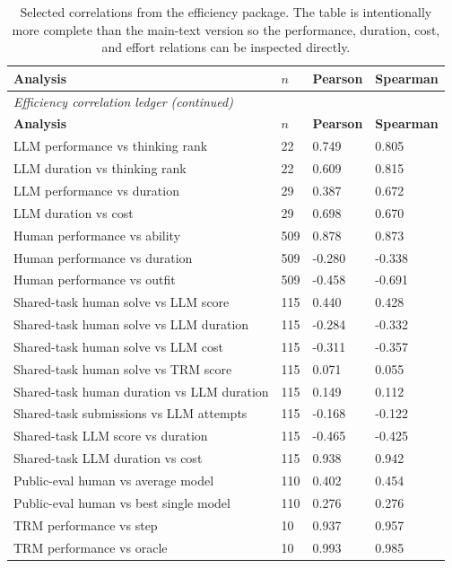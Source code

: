 \documentclass[11pt,letterpaper]{article}
\begin{document}
{\scriptsize
\begin{longtable}{p{2.8in}p{0.45in}p{0.7in}p{0.7in}}
\caption{Selected correlations from the efficiency package. The table is intentionally more complete than the main-text version so the performance, duration, cost, and effort relations can be inspected directly.} \\
\toprule
\textbf{Analysis} & \textbf{$n$} & \textbf{Pearson} & \textbf{Spearman} \\
\midrule
\endfirsthead
\multicolumn{4}{l}{\small\itshape Efficiency correlation ledger (continued)} \\
\toprule
\textbf{Analysis} & \textbf{$n$} & \textbf{Pearson} & \textbf{Spearman} \\
\midrule
\endhead
LLM performance vs thinking rank & 22 & 0.749 & 0.805 \\
LLM duration vs thinking rank & 22 & 0.609 & 0.815 \\
LLM performance vs duration & 29 & 0.387 & 0.672 \\
LLM duration vs cost & 29 & 0.698 & 0.670 \\
Human performance vs ability & 509 & 0.878 & 0.873 \\
Human performance vs duration & 509 & -0.280 & -0.338 \\
Human performance vs outfit & 509 & -0.458 & -0.691 \\
Shared-task human solve vs LLM score & 115 & 0.440 & 0.428 \\
Shared-task human solve vs LLM duration & 115 & -0.284 & -0.332 \\
Shared-task human solve vs LLM cost & 115 & -0.311 & -0.357 \\
Shared-task human solve vs TRM score & 115 & 0.071 & 0.055 \\
Shared-task human duration vs LLM duration & 115 & 0.149 & 0.112 \\
Shared-task submissions vs LLM attempts & 115 & -0.168 & -0.122 \\
Shared-task LLM score vs duration & 115 & -0.465 & -0.425 \\
Shared-task LLM duration vs cost & 115 & 0.938 & 0.942 \\
Public-eval human vs average model & 110 & 0.402 & 0.454 \\
Public-eval human vs best single model & 110 & 0.276 & 0.276 \\
TRM performance vs step & 10 & 0.937 & 0.957 \\
TRM performance vs oracle & 10 & 0.993 & 0.985 \\
\bottomrule
\end{longtable}
}



\end{document}
